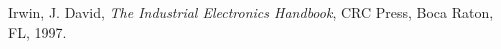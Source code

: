 
\noindent
Irwin, J. David, \textit{The Industrial Electronics Handbook}, CRC Press, Boca Raton, FL, 1997.

\vskip 10pt











